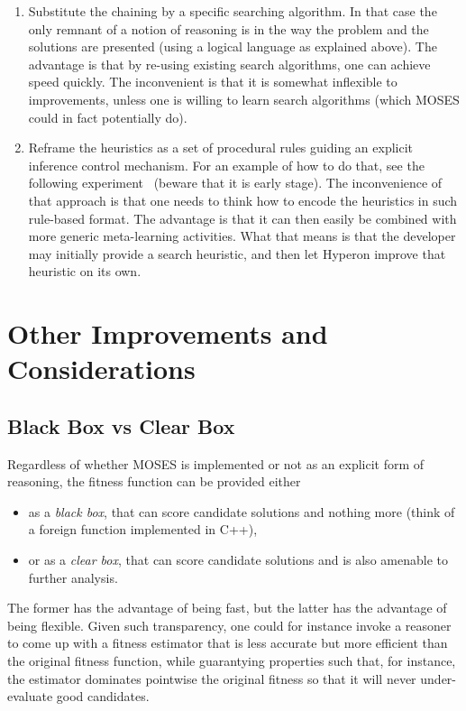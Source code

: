\documentclass[]{report}
\begin{document}
\begin{enumerate}
\begin{enumerate}
   \item Substitute the chaining by a specific searching algorithm.
     In that case the only remnant of a notion of reasoning is in the
     way the problem and the solutions are presented (using a logical
     language as explained above).  The advantage is that by re-using
     existing search algorithms, one can achieve speed quickly.  The
     inconvenient is that it is somewhat inflexible to improvements,
     unless one is willing to learn search algorithms (which MOSES
     could in fact potentially do).
   \item Reframe the heuristics as a set of procedural rules guiding
     an explicit inference control mechanism.  For an example of how
     to do that, see the following experiment~\cite{InfControl}
     (beware that it is early stage).  The inconvenience of that
     approach is that one needs to think how to encode the heuristics
     in such rule-based format.  The advantage is that it can then
     easily be combined with more generic meta-learning activities.
     What that means is that the developer may initially provide a
     search heuristic, and then let Hyperon improve that heuristic on
     its own.
   \end{enumerate}
\end{enumerate}

\section{Other Improvements and Considerations}

\subsection{Black Box vs Clear Box}
\label{sec:blackbox-clearbox}

Regardless of whether MOSES is implemented or not as an explicit form
of reasoning, the fitness function can be provided either
\begin{itemize}
\item as a \emph{black box}, that can score candidate solutions and
  nothing more (think of a foreign function implemented in C++),
\item or as a \emph{clear box}, that can score candidate solutions and
  is also amenable to further analysis.
\end{itemize}
The former has the advantage of being fast, but the latter has the
advantage of being flexible.  Given such transparency, one could for
instance invoke a reasoner to come up with a fitness estimator that is
less accurate but more efficient than the original fitness function,
while guarantying properties such that, for instance, the estimator
dominates pointwise the original fitness so that it will never
under-evaluate good candidates.
\end{document}
